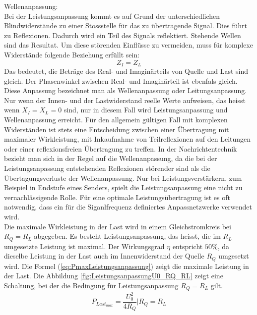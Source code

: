 Wellenanpassung: \\
Bei der Leistungsanpassung kommt es auf Grund der unterschiedlichen Blindwiderstände zu einer Stossstelle für das zu übertragende Signal. Dies führt zu Reflexionen. Dadurch wird  ein Teil des Signals reflektiert. Stehende Wellen sind das Resultat. Um diese störenden Einflüsse zu vermeiden, muss für komplexe Widerstände folgende Beziehung erfüllt sein:
\[Z_{I} = Z_{L}\]
Das bedeutet, die Beträge des Real- und Imaginärteils von Quelle und Last sind gleich.  Der Phasenwinkel zwischen Real- und Imaginärteil ist ebenfals gleich. Diese Anpassung bezeichnet man als Wellenanpassung oder Leitungsanpassung. Nur wenn der Innen- und der Lastwiderstand reelle Werte aufweisen, das heisst wenn $X_I = X_L = 0$ sind, nur in diesem Fall wird Leistungsanpassung und Wellenanpassung erreicht. Für den allgemein gültigen Fall mit komplexen Widerständen ist stets eine Entscheidung zwischen einer Übertragung mit maximaler Wirkleistung,  mit Inkaufnahme von Teilreflexionen auf den Leitungen oder einer reflexionsfreien Übertragung zu treffen. In der Nachrichtentechnik bezieht man sich in der Regel auf die Wellenanpassung, da die bei der Leistungsanpassung entstehenden Reflexionen störender sind  als die Übertagungsverluste der Wellenanpassung. Nur bei Leistungsverstärkern, zum Beispiel in Endstufe eines Senders, spielt die Leistungsanpassung eine nicht zu vernachlässigende Rolle. Für eine optimale Leistungsübertragung ist es oft notwendig, dass ein für die Siganlfrequenz definiertes Anpassnetzwerke verwendet wird. \\

Die maximale Wirkleistung in der Last wird in einem Gleichstromkreis bei $R_Q = R_L$ abgegeben. Es besteht Leistungsanpassung, das heisst, die im $R_L$ umgesetzte Leistung ist maximal. Der Wirkungsgrad $\eta$ entspricht $50\%$, da dieselbe Leistung  in der Last auch im Innenwiderstand der Quelle $R_Q$ umgesetzt wird. Die Formel (\ref{eq:PmaxLeistungsanpassung}) zeigt die maximale Leistung in der Last. Die Abbildung \ref{fig:LeistungsanpassungU0_RQ_RL} zeigt eine Schaltung, bei der die Bedingung für Leistungsanpassung $R_Q = R_L$ gilt.
\begin{eqnarray}\label{eq:PmaxLeistungsanpassung}
P_{Last_{max}}=\dfrac{U_{0}^2}{4R_Q} | R_Q=R_L
\end{eqnarray}

